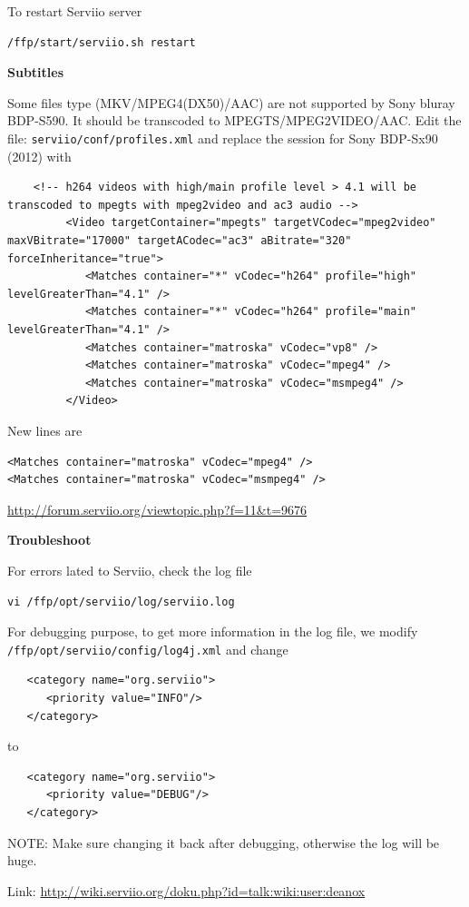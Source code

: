 To restart Serviio server
\begin{verbatim}
/ffp/start/serviio.sh restart
\end{verbatim}

{\bf Subtitles}

Some files type (MKV/MPEG4(DX50)/AAC) are not supported by Sony bluray BDP-S590.
It should be transcoded to MPEGTS/MPEG2VIDEO/AAC. Edit the file:
\verb!serviio/conf/profiles.xml! and replace the session for Sony BDP-Sx90
(2012) with
\begin{verbatim}
    <!-- h264 videos with high/main profile level > 4.1 will be transcoded to mpegts with mpeg2video and ac3 audio -->
         <Video targetContainer="mpegts" targetVCodec="mpeg2video" maxVBitrate="17000" targetACodec="ac3" aBitrate="320" forceInheritance="true">
            <Matches container="*" vCodec="h264" profile="high" levelGreaterThan="4.1" />
            <Matches container="*" vCodec="h264" profile="main" levelGreaterThan="4.1" />
            <Matches container="matroska" vCodec="vp8" />
            <Matches container="matroska" vCodec="mpeg4" />
            <Matches container="matroska" vCodec="msmpeg4" />
         </Video>
\end{verbatim}
New lines are
\begin{verbatim}
<Matches container="matroska" vCodec="mpeg4" />
<Matches container="matroska" vCodec="msmpeg4" />
\end{verbatim}

\url{http://forum.serviio.org/viewtopic.php?f=11&t=9676}

{\bf Troubleshoot}

For errors lated to Serviio, check the log file
\begin{verbatim}
vi /ffp/opt/serviio/log/serviio.log
\end{verbatim}

For debugging purpose, to get more information in the log file, we modify
\verb!/ffp/opt/serviio/config/log4j.xml! and change
\begin{verbatim}
   <category name="org.serviio">
      <priority value="INFO"/>
   </category>
\end{verbatim}
to 
\begin{verbatim}
   <category name="org.serviio">
      <priority value="DEBUG"/>
   </category>
\end{verbatim}
NOTE: Make sure changing it back after debugging, otherwise the log will be
huge.


Link: \url{http://wiki.serviio.org/doku.php?id=talk:wiki:user:deanox}

